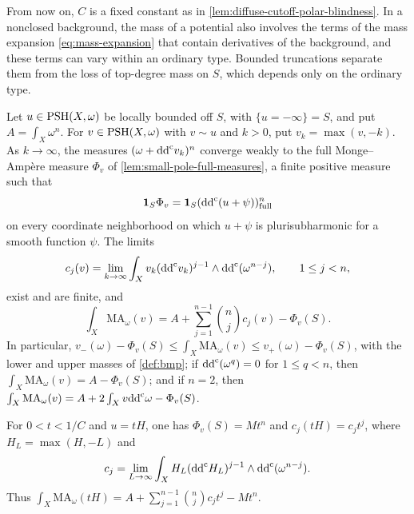 From now on, $C$ is a fixed constant as in \cref{lem:diffuse-cutoff-polar-blindness}. In a nonclosed background, the mass of a potential also involves the terms of the mass expansion \eqref{eq:mass-expansion} that contain derivatives of the background, and these terms can vary within an ordinary type. Bounded truncations separate them from the loss of top-degree mass on $S$, which depends only on the ordinary type.

\begin{proposition}\label{prop:diffuse-representative-mass}\label{prop:diffuse-hermitian-mass-polynomial}
Let $u\in\mathrm{PSH}(X,\omega)$ be locally bounded off $S$, with $\{u=-\infty\}=S$, and put $A=\int_X\omega^n$. For $v\in\mathrm{PSH}(X,\omega)$ with $v\sim u$ and $k>0$, put $v_k=\max(v,-k)$. As $k\to\infty$, the measures $(\omega+\mathrm{dd}^{\mathrm{c}} v_k)^n$ converge weakly to the full Monge--Amp\`ere measure $\Phi_v$ of \cref{lem:small-pole-full-measures}, a finite positive measure such that
\begin{equation}\label{eq:diffuse-residual-local}
 \mathbf1_S\Phi_v=\mathbf1_S(\mathrm{dd}^{\mathrm{c}}(u+\psi))^n_{\mathrm{full}}
\end{equation}
on every coordinate neighborhood on which $u+\psi$ is plurisubharmonic for a smooth function $\psi$. The limits
\[
 c_j(v)=\lim_{k\to\infty}\int_X
     v_k(\mathrm{dd}^{\mathrm{c}} v_k)^{j-1}\wedge\mathrm{dd}^{\mathrm{c}}(\omega^{n-j}),
       \qquad 1\leq j<n,
\]
exist and are finite, and
\[
 \int_X\mathrm{MA}_\omega(v)
       =A+\sum_{j=1}^{n-1}\binom nj c_j(v)-\Phi_v(S).
\]
In particular, $v_-(\omega)-\Phi_v(S)\leq\int_X\mathrm{MA}_\omega(v)\leq v_+(\omega)-\Phi_v(S)$, with the lower and upper masses of \cref{def:bmp}; if $\mathrm{dd}^{\mathrm{c}}(\omega^q)=0$ for $1\leq q<n$, then $\int_X\mathrm{MA}_\omega(v)=A-\Phi_v(S)$; and if $n=2$, then $\int_X\mathrm{MA}_\omega(v)=A+2\int_Xv\mathrm{dd}^{\mathrm{c}}\omega-\Phi_v(S)$.

For $0<t<1/C$ and $u=tH$, one has $\Phi_v(S)=Mt^n$ and $c_j(tH)=c_jt^j$, where $H_L=\max(H,-L)$ and
\[
 c_j=\lim_{L\to\infty}\int_X
       H_L(\mathrm{dd}^{\mathrm{c}} H_L)^{j-1}\wedge\mathrm{dd}^{\mathrm{c}}(\omega^{n-j}).
\]
Thus $\int_X\mathrm{MA}_\omega(tH)=A+\sum_{j=1}^{n-1}\binom nj c_jt^j-Mt^n$.
\end{proposition}
